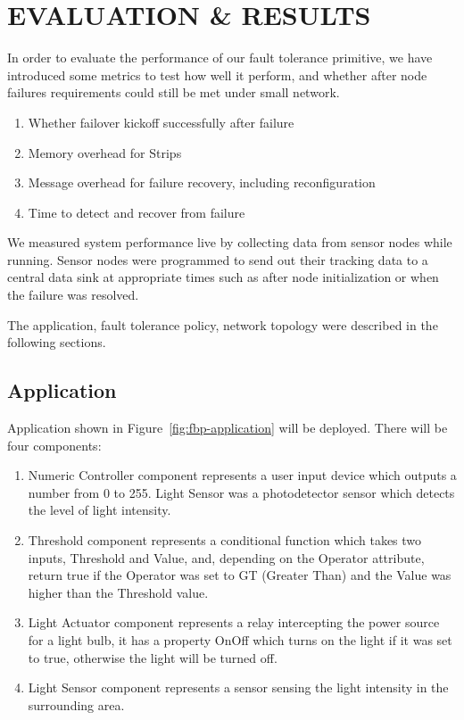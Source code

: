 \cleardoublepage
\singlespacing
\chapter{EVALUATION \& RESULTS}
\label{c:evaluation}
\doublespacing\nointerlineskip


In order to evaluate the performance of our fault tolerance primitive, we have
introduced some metrics to test how well it perform, and whether after node
failures requirements could still be met under small network.

\begin{enumerate}
\item Whether failover kickoff successfully after failure
\item Memory overhead for Strips
\item Message overhead for failure recovery, including reconfiguration
\item Time to detect and recover from failure
\end{enumerate}

We measured system performance live by collecting data from sensor nodes while
running. Sensor nodes were programmed to send out their tracking data to
a central data sink at appropriate times such as after node initialization or
when the failure was resolved.

The application, fault tolerance policy, network topology were described in the
following sections.


\section{Application}

Application shown in Figure~\ref{fig:fbp-application} will be deployed.  There
will be four components: 

\begin{enumerate}
\item Numeric Controller component represents a user input device which outputs
a number from 0 to 255. Light Sensor was a photodetector sensor which detects the
level of light intensity. 
\item Threshold component represents a conditional function which takes two
inputs, Threshold and Value, and, depending on the Operator attribute, return
true if the Operator was set to GT (Greater Than) and the Value was higher than
the Threshold value.
\item Light Actuator component represents a relay intercepting the power source for
a light bulb, it has a property OnOff which turns on the light if it was set to
true, otherwise the light will be turned off.
\item Light Sensor component represents a sensor sensing the light intensity in the surrounding
  area.
\end{enumerate}


